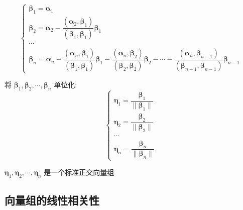 \begin{definition}[向量的内积和正交]
	$$\begin{cases}
		\boldsymbol{\beta}_{1} = \boldsymbol{\alpha}_{1}\\
		\boldsymbol{\beta}_{2} = \boldsymbol{\alpha}_{2}-\dfrac{(\boldsymbol{\alpha}_{2},\boldsymbol{\beta}_{1})}{(\boldsymbol{\beta}_{1},\boldsymbol{\beta}_{1})}\boldsymbol{\beta}_{1}\\
		\cdots\\
		\boldsymbol{\beta}_{n} = \boldsymbol{\alpha}_{n}-\dfrac{(\boldsymbol{\alpha}_{n},\boldsymbol{\beta}_{1})}{(\boldsymbol{\beta}_{1},\boldsymbol{\beta}_{1})}\boldsymbol{\beta}_{1}-\dfrac{(\boldsymbol{\alpha}_{n},\boldsymbol{\beta}_{2})}{(\boldsymbol{\beta}_{2},\boldsymbol{\beta}_{2})}\boldsymbol{\beta}_{2}-\cdots-\dfrac{(\boldsymbol{\alpha}_{n},\boldsymbol{\beta}_{n-1})}{(\boldsymbol{\beta}_{n-1},\boldsymbol{\beta}_{n-1})}\boldsymbol{\beta}_{n-1}
	\end{cases}$$

	将 $\boldsymbol{\beta}_{1}, \boldsymbol{\beta}_{2}, \cdots, \boldsymbol{\beta}_{n}$ 单位化:
	$$\begin{cases}
		\boldsymbol{\eta}_{1} = \dfrac{\boldsymbol{\beta}_{1}}{\|\boldsymbol{\beta}_{1}\|}\\
		\boldsymbol{\eta}_{2} = \dfrac{\boldsymbol{\beta}_{2}}{\|\boldsymbol{\beta}_{2}\|}\\
		\cdots\\
		\boldsymbol{\eta}_{n} = \dfrac{\boldsymbol{\beta}_{n}}{\|\boldsymbol{\beta}_{n}\|}
	\end{cases}$$  
	
	$\boldsymbol{\eta}_{1}, \boldsymbol{\eta}_{2}, \cdots, \boldsymbol{\eta}_{n}$ 是一个标准正交向量组
\end{definition}

\subsection{向量组的线性相关性}

